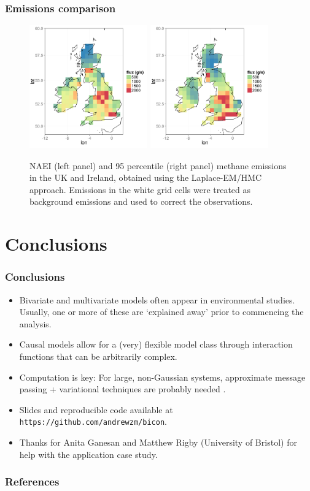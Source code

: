 \documentclass{beamer}
\begin{document}
\begin{frame}
\frametitle{Emissions comparison}

\begin{figure}
\includegraphics[width=2.0in]{NAEI_land_only.png}  
\includegraphics[width=2.0in]{Em95.png}  
	\caption{NAEI (left panel) and 95 percentile (right panel) methane emissions in the UK and Ireland, obtained using the Laplace-EM/HMC approach. Emissions in the white grid cells were treated as background emissions and used to correct the observations.}
\end{figure}
\end{frame}



\section{Conclusions}

\begin{frame}
\sectionpage
\end{frame}


\begin{frame}
\frametitle{Conclusions}

\begin{itemize}
\item Bivariate and multivariate models often appear in environmental studies. Usually, one or more of these are `explained away' prior to commencing the analysis.
\item Causal models allow for a (very) flexible model class through interaction functions that can be arbitrarily complex.
\item Computation is key: For large, non-Gaussian systems, approximate message passing + variational techniques are probably needed \citep{Cseke_2014}.
\item Slides and reproducible code available at \texttt{https://github.com/andrewzm/bicon}.
\item Thanks for Anita Ganesan and Matthew Rigby (University of Bristol) for help with the application case study.
\end{itemize}
\end{frame}

\small

\begin{frame}[allowframebreaks]
\frametitle{References}




\end{frame}
\end{document}

